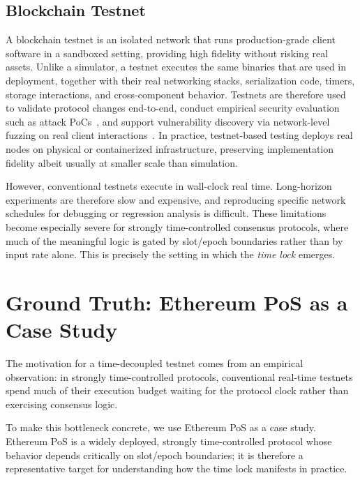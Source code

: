 \subsection{Blockchain Testnet}

A blockchain testnet is an isolated network that runs production-grade client software in a sandboxed setting, providing high fidelity without risking real assets. Unlike a simulator, a testnet executes the same binaries that are used in deployment, together with their real networking stacks, serialization code, timers, storage interactions, and cross-component behavior. Testnets are therefore used to validate protocol changes end-to-end, conduct empirical security evaluation such as attack PoCs~\cite{3posAttack,neuder2021low,neu2021ebb,yaish2024speculative,zhang2024max}, and support vulnerability discovery via network-level fuzzing on real client interactions~\cite{ma2023phoenix,chen2023tyr,ma2023loki}. In practice, testnet-based testing deploys real nodes on physical or containerized infrastructure, preserving implementation fidelity albeit usually at smaller scale than simulation.

However, conventional testnets execute in wall-clock real time. Long-horizon experiments are therefore slow and expensive, and reproducing specific network schedules for debugging or regression analysis is difficult. These limitations become especially severe for strongly time-controlled consensus protocols, where much of the meaningful logic is gated by slot/epoch boundaries rather than by input rate alone. This is precisely the setting in which the \emph{time lock} emerges.

\section{Ground Truth: Ethereum PoS as a Case Study}
\label{sec:GroundTruth}

The motivation for a time-decoupled testnet comes from an empirical observation: in strongly time-controlled protocols, conventional real-time testnets spend much of their execution budget waiting for the protocol clock rather than exercising consensus logic.

To make this bottleneck concrete, we use Ethereum PoS as a case study. Ethereum PoS is a widely deployed, strongly time-controlled protocol whose behavior depends critically on slot/epoch boundaries; it is therefore a representative target for understanding how the time lock manifests in practice.

